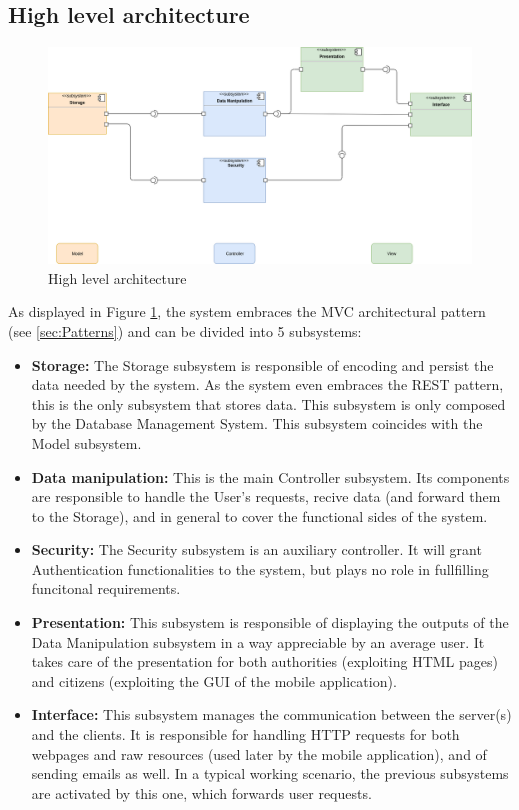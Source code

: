 \documentclass{article}
\begin{document}
	\subsection{High level architecture}
		\begin{figure}[h]
			\includegraphics[width=\linewidth]{images/High_level_architecture.png}
			\caption{High level architecture}
			\label{fig:HighLevelArchitecture}
		\end{figure}
		As displayed in Figure \ref{fig:HighLevelArchitecture}, the system embraces the MVC architectural pattern (see \ref{sec:Patterns}) and can be divided into 5 subsystems:
		\begin{itemize}
			\item \textbf{Storage:} 
				The Storage subsystem is responsible of encoding and persist the data needed by the system. 
				As the system even embraces the REST pattern, this is the only subsystem that stores data. 
				This subsystem is only composed by the Database Management System. This subsystem coincides with the Model subsystem.
			\item \textbf{Data manipulation:} 
				This is the main Controller subsystem. 
				Its components are responsible to handle the User's requests, recive data (and forward them to the Storage), and in general to cover the functional 
				sides of the system.
			\item \textbf{Security:} 
				The Security subsystem is an auxiliary controller. It will grant Authentication functionalities to the system, but plays no role in fullfilling
				funcitonal requirements.
			\item \textbf{Presentation:}
				This subsystem is responsible of displaying the outputs of the Data Manipulation subsystem in a way appreciable by an average user. 
				It takes care of the presentation for both authorities (exploiting HTML pages) and citizens (exploiting the GUI of the mobile application).
			\item \textbf{Interface:}
				This subsystem manages the communication between the server(s) and the clients. It is responsible for handling HTTP requests for both webpages and
				raw resources (used later by the mobile application), and of sending emails as well. In a typical working scenario, the previous subsystems are
				activated by this one, which forwards user requests.
		\end{itemize}
		\FloatBarrier
\end{document}
